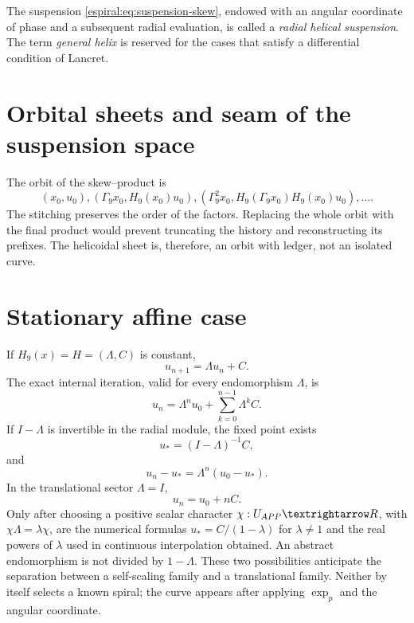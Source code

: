 \begin{definition}
The suspension \cref{espiral:eq:suspension-skew}, endowed with an angular coordinate
of phase and a subsequent radial evaluation, is called a \emph{radial helical
suspension}. The term \emph{general helix} is reserved for the
cases that satisfy a differential condition of Lancret.
\end{definition}

\section{Orbital sheets and seam of the suspension space}

The orbit of the skew--product is
\[
 (x_0,u_0),
 (\Gamma_9x_0,H_9(x_0)u_0),
 (\Gamma_9^2x_0,H_9(\Gamma_9x_0)H_9(x_0)u_0),\ldots.
\]
The stitching preserves the order of the factors. Replacing the whole orbit with the
final product would prevent truncating the history and reconstructing its prefixes. The
helicoidal sheet is, therefore, an orbit with ledger, not an isolated curve.

\section{Stationary affine case}

If \(H_9(x)=H=(\Lambda,C)\) is constant,
\[
 u_{n+1}=\Lambda u_n+C.
\]
The exact internal iteration, valid for every endomorphism \(\Lambda\), is
\begin{equation}
 u_n=\Lambda^n u_0+\sum_{k=0}^{n-1}\Lambda^kC.
 \label{espiral:eq:orbita-afin-estacionaria-general}
\end{equation}
If \(I-\Lambda\) is invertible in the radial module, the fixed point exists
\[
 u_*=(I-\Lambda)^{-1}C,
\]
and
\begin{equation}
 u_n-u_*=\Lambda^n(u_0-u_*).
 \label{espiral:eq:orbita-afin-estacionaria}
\end{equation}
In the translational sector \(\Lambda=I\),
\[
 u_n=u_0+nC.
\]
Only after choosing a positive scalar character
\(\chi:U_{\APP}\to\R\), with
\(\chi\Lambda=\lambda\chi\), are the numerical formulas
\(u_*=C/(1-\lambda)\) for \(\lambda\neq1\) and the real powers of
\(\lambda\) used in continuous interpolation obtained. An
abstract endomorphism is not divided by \(1-\Lambda\).
These two possibilities anticipate the separation between a
self-scaling family and a translational family. Neither by itself selects a
known spiral; the curve appears after applying \(\exp_p\) and the
angular coordinate.


